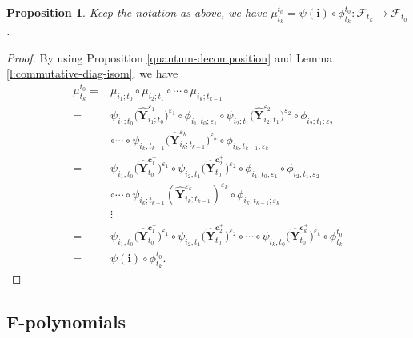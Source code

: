 \documentclass[pdftex]{sigma}
\numberwithin{equation}{section}
\newtheorem{Proposition}[Theorem]{Proposition}
 { \theoremstyle{definition}
\newtheorem{Definition}[Theorem]{Definition}
\newtheorem{Note}[Theorem]{Note}
\newtheorem{Example}[Theorem]{Example}
\newtheorem{Remark}[Theorem]{Remark} }
\begin{document}
\begin{Proposition}\label{long-quantum-decomposition}
 Keep the notation as above, we have
 $\mu_{t_k}^{t_0}=\psi(\mathbf{i})\circ\phi_{t_{k}}^{t_0}\colon  \mathcal{F}_{t_{k}}\to\mathcal{F}_{t_{0}}$.
\end{Proposition}
\begin{proof}
 By using Proposition \ref{quantum-decomposition} and Lemma \ref{l:commutative-diag-isom}, we have
 \begin{align*}
 \mu_{t_k}^{t_0}
 ={}&\mu_{i_1;t_0}\circ\mu_{i_2;t_1}\circ\cdots\circ\mu_{i_k;t_{k-1}}\\
 ={}&\psi_{i_{1};t_{0}}\bigl(\mathbf{\hat{Y}}_{i_{1};t_{0}}^{\varepsilon_{1}}\bigr)^{\varepsilon_{1}}\circ\phi_{i_{1};t_{0};\varepsilon_{1}}\circ\psi_{i_{2};t_{1}}
 \bigl(\mathbf{\hat{Y}}_{i_{2};t_{1}}^{\varepsilon_{2}}\bigr)^{\varepsilon_{2}}\circ\phi_{i_{2};t_{1};\varepsilon_{2}}\\
 &\circ\cdots\circ\psi_{i_{k};t_{k-1}}
 \bigl(\mathbf{\hat{Y}}_{i_{k};t_{k-1}}^{\varepsilon_{k}}\bigr)^{\varepsilon_{k}}\circ\phi_{i_{k};t_{k-1};\varepsilon_{k}}\\
 ={}&\psi_{i_{1};t_{0}}\bigl(\mathbf{\hat{Y}}_{t_{0}}^{\mathbf{c}_{1}^{+}}\bigr)^{\varepsilon_{1}}\circ\psi_{i_{2};t_{1}}\bigl(\mathbf{\hat{Y}}_{t_{0}}^{\mathbf{c}_{2}^{+}}\bigr)^{\varepsilon_{2}}\circ\phi_{i_{1};t_{0};\varepsilon_{1}}\circ\phi_{i_{2};t_{1};\varepsilon_{2}}\\
 &\circ\cdots\circ\psi_{i_{k};t_{k-1}}(\mathbf{\hat{Y}}_{i_{k};t_{k-1}}^{\varepsilon_{k}})^{\varepsilon_{k}}\circ\phi_{i_{k};t_{k-1};\varepsilon_{k}}\\
 &\vdots\\
 ={}&\psi_{i_{1};t_{0}}\bigl(\mathbf{\hat{Y}}_{t_{0}}^{\mathbf{c}_{1}^{+}}\bigr)^{\varepsilon_{1}}\circ\psi_{i_{2};t_{1}}\bigl(\mathbf{\hat{Y}}_{t_{0}}^{\mathbf{c}_{2}^{+}}\bigr)^{\varepsilon_{2}}\circ\cdots\circ\psi_{i_{k};t_{0}}
 \bigl(\mathbf{\hat{Y}}_{t_{0}}^{\mathbf{c}_{k}^{+}}\bigr)^{\varepsilon_{k}}\circ\phi_{t_{k}}^{t_0}\\
 ={}&\psi(\mathbf{i})\circ\phi_{t_{k}}^{t_0}.\tag*{\qed}
 \end{align*}\renewcommand{\qed}{}
\end{proof}

\subsection[F-polynomials]{$\boldsymbol{F}$-polynomials}\label{s:F-poly_gen_quantum_cluster_alg}
\end{document}
